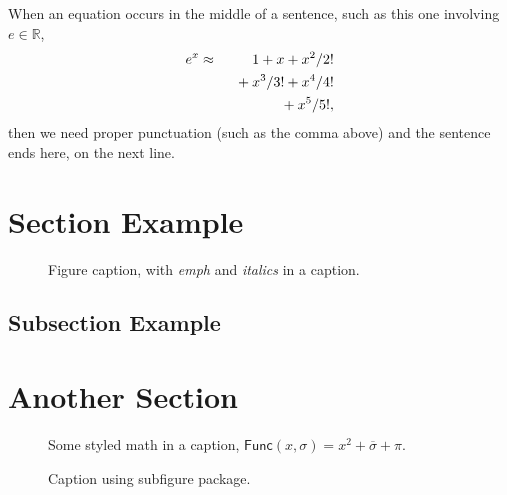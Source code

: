 \lipsum*[65]

When an equation occurs in the middle of a sentence, such as this one involving $e \in \mathbb{R}$,
\begin{eqnarray}
 e^x &\approx& 1+x+x^2/2! \nonumber \\
   && \hphantom{1} + x^3/3! + x^4/4! \nonumber \\
   && \hphantom{1} + x^5/5!,
\end{eqnarray}
then we need proper punctuation (such as the comma above) and the sentence ends here, on the next line.

\section{Section Example}
\lipsum[47]

\vspace{8mm} %
\begin{figure}[!htb]
    \framebox[\textwidth]{\parbox{\textwidth}{\lipsum[65]}}
    \caption{Figure caption, with \emph{emph} and \textit{italics} in a caption.}
\end{figure}

\subsection{Subsection Example}
\lipsum[56]

\section{Another Section}
\lipsum[55-56]

\vspace{8mm} %
\begin{figure}[!htb]
    \framebox[\textwidth]{\parbox{\textwidth}{\lipsum[65]}}
    \caption{Some styled math in a caption, $\mathsf{Func}(x, \sigma) = x^2 + \overline{\sigma} + \pi$.}
\end{figure}

\begin{figure}[!htb]
    \centering
    \hfill
    \caption{Caption using subfigure package.}
\end{figure}


